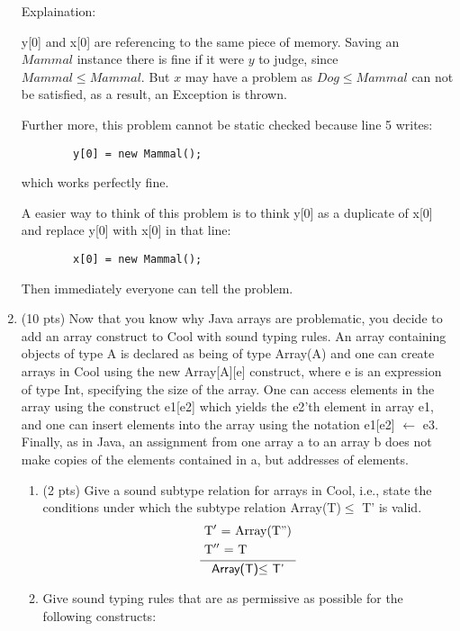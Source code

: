\documentclass[10pt]{article}
\newcommand{\infertext}[2]{\infer{{\textrm{#2}}}{\begin{aligned}#1\end{aligned}}}
\begin{document}
\begin{enumerate}
Explaination:
\par y[0] and x[0] are referencing to the same piece of memory. Saving an $Mammal$ instance there is fine if it were $y$ to judge, since $Mammal \leq Mammal$. But $x$ may have a problem as $Dog \leq Mammal$ can not be satisfied, as a result, an Exception is thrown.
\par Further more, this problem cannot be static checked because line 5 writes:
\begin{lstlisting}
		y[0] = new Mammal();
\end{lstlisting}
which works perfectly fine.
\par A easier way to think of this problem is to think y[0] as a duplicate of x[0] and replace y[0] with x[0] in that line:
\begin{lstlisting}
		x[0] = new Mammal();
\end{lstlisting}
Then immediately everyone can tell the problem.
\medskip
\item (10 pts) Now that you know why Java arrays are problematic, you decide to add an array construct
to Cool with sound typing rules. An array containing objects of type A is declared as being of type
\textsf{Array(A)} and one can create arrays in Cool using the \textsf{new Array[A][e]} construct, where \textsf{e} is an
expression of type \textsf{Int}, specifying the size of the array.
One can access elements in the array using
the construct \textsf{e1[e2]} which yields the \textsf{e2}'th element in array \textsf{e1},
and one can insert elements into the array using the notation \textsf{e1[e2] $\leftarrow$ e3}.
Finally, as in Java, an assignment from one array \textsf{a} to an
array \textsf{b} does not make copies of the elements contained in \textsf{a}, but addresses of elements.

\begin{enumerate}
  \item (2 pts) Give a sound subtype relation for arrays in Cool, i.e., state the conditions under which
the subtype relation \textsf{Array(T)$\le$ T'} is valid.
\begin{equation}\infertext{
	& \textrm{ T$'$ = Array(T{''}) } \\
	& \textrm{ T${''}$ = T}
} {
	\textsf{Array(T)$\le$ T'}	
}\end{equation}
  \item Give sound typing rules that are as permissive as possible for the following constructs:


\end{enumerate}
\end{enumerate}
\end{document}
